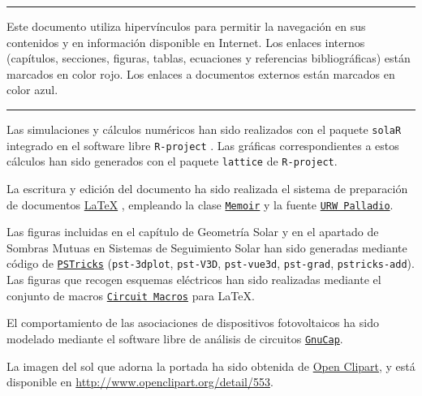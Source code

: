 
\chapterprecis{\vfill{}}

\rule[.5ex]{\linewidth}{1pt}

Este documento utiliza hipervínculos para permitir la navegación en
sus contenidos y en información disponible en Internet. Los enlaces
internos (capítulos, secciones, figuras, tablas, ecuaciones y
referencias bibliográficas) están marcados en color rojo. Los enlaces
a documentos externos están marcados en color azul.

\rule[.5ex]{\linewidth}{1pt}
Las simulaciones y cálculos numéricos han sido realizados con el paquete
\texttt{solaR} \citep{Perpinan2012b} integrado en el software libre
\texttt{R-project} \citep{RDevelopmentCoreTeam2013}. Las gráficas
correspondientes a estos cálculos han sido generados con el paquete
\texttt{lattice} \citep{Sarkar2010} de \texttt{R-project}. 

La escritura y edición del documento ha sido realizada el sistema de preparación
de documentos \href{http://www.latex-project.org/}{\LaTeX{}} , empleando
la clase \href{http://www.ctan.org/tex-archive/macros/latex/contrib/memoir/}{\texttt{Memoir}}
y la fuente \href{http://www.tug.dk/FontCatalogue/palatino/}{\texttt{URW Palladio}}.

Las figuras incluidas en el capítulo de Geometría Solar y en el
apartado de Sombras Mutuas en Sistemas de Seguimiento Solar han sido
generadas mediante código de
\href{http://www.tug.org/PSTricks}{\texttt{PSTricks}}
(\texttt{pst-3dplot}, \texttt{pst-V3D}, \texttt{pst-vue3d},
\texttt{pst-grad}, \texttt{pstricks-add}).  Las figuras que recogen
esquemas eléctricos han sido realizadas mediante el conjunto de macros
\href{http://ece.uwaterloo.ca/~aplevich/Circuit_macros/}{\texttt{Circuit
    Macros}} para \LaTeX{}.

El comportamiento de las asociaciones de dispositivos fotovoltaicos
ha sido modelado mediante el software libre de análisis de circuitos
\href{http://www.gnu.org/software/gnucap/}{\texttt{GnuCap}}.

La imagen del sol que adorna la portada ha sido obtenida de
\href{http://www.openclipart.org/}{Open Clipart}, y está disponible en \url{http://www.openclipart.org/detail/553}.



